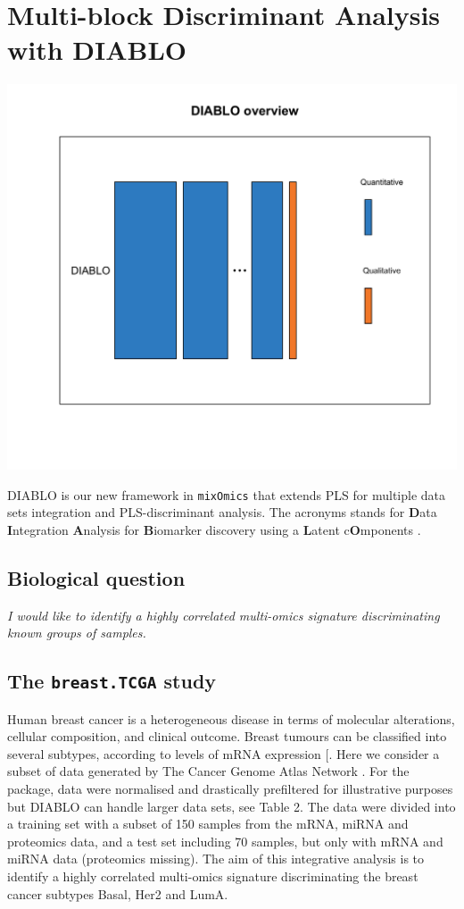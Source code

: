 \documentclass[]{book}
\theoremstyle{definition}
\theoremstyle{definition}
\theoremstyle{definition}
\theoremstyle{remark}
\begin{document}
\chapter{Multi-block Discriminant Analysis with DIABLO}\label{diablo}

\begin{center}\includegraphics[width=0.5\linewidth]{Figures/overview-DIABLO-1} \end{center}

DIABLO is our new framework in \texttt{mixOmics} that extends PLS for
multiple data sets integration and PLS-discriminant analysis. The
acronyms stands for \textbf{D}ata \textbf{I}ntegration \textbf{A}nalysis
for \textbf{B}iomarker discovery using a \textbf{L}atent
c\textbf{O}mponents \citep{Sin16}.

\section{Biological question}\label{biological-question-4}

{ \emph{I would like to identify a highly correlated multi-omics
signature discriminating known groups of samples.} }

\section{\texorpdfstring{The \texttt{breast.TCGA}
study}{The breast.TCGA study}}\label{the-breast.tcga-study}

Human breast cancer is a heterogeneous disease in terms of molecular
alterations, cellular composition, and clinical outcome. Breast tumours
can be classified into several subtypes, according to levels of mRNA
expression {[}\citet{Sor01}. Here we consider a subset of data generated
by The Cancer Genome Atlas Network \citep{TCGA12}. For the package, data
were normalised and drastically prefiltered for illustrative purposes
but DIABLO can handle larger data sets, see \citep{mixomics} Table 2.
The data were divided into a training set with a subset of 150 samples
from the mRNA, miRNA and proteomics data, and a test set including 70
samples, but only with mRNA and miRNA data (proteomics missing). The aim
of this integrative analysis is to identify a highly correlated
multi-omics signature discriminating the breast cancer subtypes Basal,
Her2 and LumA.
\end{document}
